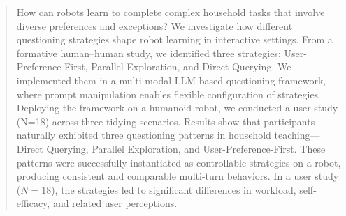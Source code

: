 \documentclass[sigconf,authordraft]{acmart}
\begin{document}
\author{Dai Shi}

\author{Suming Li}

\author{Yujie Qiu}

\author{Yate Ge}

\author{Qi Wang}

\author{Xiaohua Sun}

\author{Weiwei Guo}


\renewcommand{\shortauthors}{Trovato et al.}

\begin{abstract}
How can robots learn to complete complex household tasks that involve diverse preferences and exceptions? We investigate how different questioning strategies shape robot learning in interactive settings. From a formative human–human study, we identified three strategies: User-Preference-First, Parallel Exploration, and Direct Querying. We implemented them in a multi-modal LLM-based questioning framework, where prompt manipulation enables flexible configuration of strategies. Deploying the framework on a humanoid robot, we conducted a user study (N=18) across three tidying scenarios. Results show that participants naturally exhibited three questioning patterns in household teaching—Direct Querying, Parallel Exploration, and User-Preference-First. These patterns were successfully instantiated as controllable strategies on a robot, producing consistent and comparable multi-turn behaviors. In a user study ($N=18$), the strategies led to significant differences in workload, self-efficacy, and related user perceptions.
\end{abstract}
\end{document}
